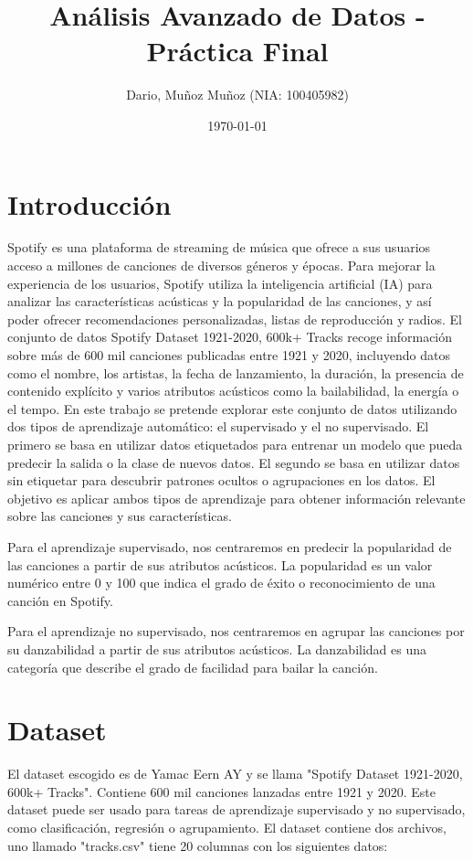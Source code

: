 \documentclass{wsdcr}
\title{Análisis Avanzado de Datos - Práctica Final}
\author{Dario, Muñoz Muñoz (NIA: 100405982)}
\date{\today}
\begin{document}
\maketitle

\section{Introducción}
Spotify es una plataforma de streaming de música que ofrece a sus usuarios acceso a millones de canciones de diversos géneros y épocas. Para mejorar la experiencia de los usuarios, Spotify utiliza la inteligencia artificial (IA) para analizar las características acústicas y la popularidad de las canciones, y así poder ofrecer recomendaciones personalizadas, listas de reproducción y radios. El conjunto de datos Spotify Dataset 1921-2020, 600k+ Tracks recoge información sobre más de 600 mil canciones publicadas entre 1921 y 2020, incluyendo datos como el nombre, los artistas, la fecha de lanzamiento, la duración, la presencia de contenido explícito y varios atributos acústicos como la bailabilidad, la energía o el tempo. En este trabajo se pretende explorar este conjunto de datos utilizando dos tipos de aprendizaje automático: el supervisado y el no supervisado. El primero se basa en utilizar datos etiquetados para entrenar un modelo que pueda predecir la salida o la clase de nuevos datos. El segundo se basa en utilizar datos sin etiquetar para descubrir patrones ocultos o agrupaciones en los datos. El objetivo es aplicar ambos tipos de aprendizaje para obtener información relevante sobre las canciones y sus características.

Para el aprendizaje supervisado, nos centraremos en predecir la popularidad de las canciones a partir de sus atributos acústicos. La popularidad es un valor numérico entre 0 y 100 que indica el grado de éxito o reconocimiento de una canción en Spotify.

Para el aprendizaje no supervisado, nos centraremos en agrupar las canciones por su danzabilidad a partir de sus atributos acústicos. La danzabilidad es una categoría que describe el grado de facilidad para bailar la canción.

\section{Dataset}

El dataset escogido es de Yamac Eern AY y se llama "Spotify Dataset 1921-2020, 600k+ Tracks". Contiene 600 mil canciones lanzadas entre 1921 y 2020. Este dataset puede ser usado para tareas de aprendizaje supervisado y no supervisado, como clasificación, regresión o agrupamiento. El dataset contiene dos archivos, uno llamado "tracks.csv" tiene 20 columnas con los siguientes datos:
\end{document}
